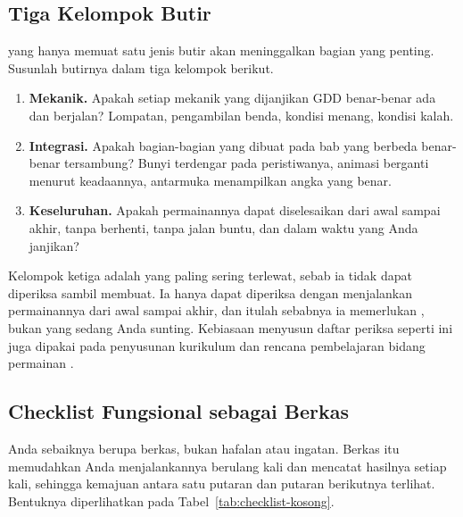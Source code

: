 \subsection{Tiga Kelompok Butir}

 yang hanya memuat satu jenis butir akan meninggalkan
bagian yang penting. Susunlah butirnya dalam tiga kelompok berikut.

\begin{enumerate}
  \item \textbf{Mekanik.} Apakah setiap mekanik yang dijanjikan GDD benar-benar
        ada dan berjalan? Lompatan, pengambilan benda, kondisi menang,
        kondisi kalah.
  \item \textbf{Integrasi.} Apakah bagian-bagian yang dibuat pada bab yang
        berbeda benar-benar tersambung? Bunyi terdengar pada peristiwanya,
        animasi berganti menurut keadaannya, antarmuka menampilkan angka yang
        benar.
  \item \textbf{Keseluruhan.} Apakah permainannya dapat diselesaikan dari awal
        sampai akhir, tanpa berhenti, tanpa jalan buntu, dan dalam waktu yang
        Anda janjikan?
\end{enumerate}

Kelompok ketiga adalah yang paling sering terlewat, sebab ia tidak dapat
diperiksa sambil membuat. Ia hanya dapat diperiksa dengan menjalankan
permainannya dari awal sampai akhir, dan itulah sebabnya ia memerlukan
, bukan  yang sedang Anda sunting. Kebiasaan
menyusun daftar periksa seperti ini juga dipakai pada penyusunan kurikulum dan
rencana pembelajaran bidang permainan \cite{polibatam-kurikulum}.

\subsection{Checklist Fungsional sebagai Berkas}

 Anda sebaiknya berupa berkas, bukan hafalan atau ingatan.
Berkas itu memudahkan Anda menjalankannya berulang kali dan mencatat hasilnya
setiap kali, sehingga kemajuan antara satu putaran dan putaran berikutnya
terlihat. Bentuknya diperlihatkan pada Tabel~\ref{tab:checklist-kosong}.

